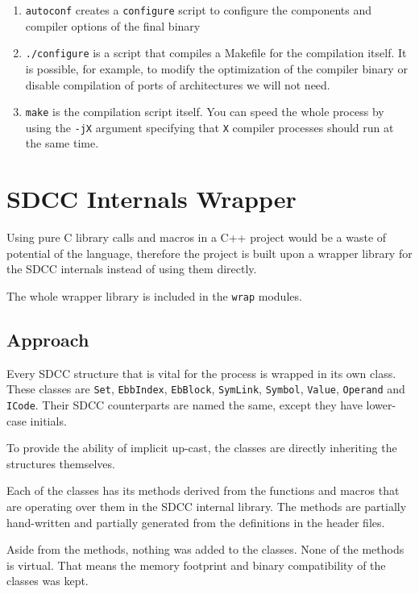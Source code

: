         \begin{enumerate}
        \item \texttt{autoconf} creates a \texttt{configure} script to configure the components and compiler options of the final binary
        \item \texttt{./configure} is a script that compiles a Makefile for the compilation itself. It is possible, for example, to modify the optimization of the compiler binary or disable compilation of ports of architectures we will not need.
        \item \texttt{make} is the compilation script itself. You can speed the whole process by using the \texttt{-jX} argument specifying that \texttt{X} compiler processes should run at the same time.
        \end{enumerate}

    \section{SDCC Internals Wrapper}

    Using pure C library calls and macros in a C++ project would be a waste of potential of the language, therefore the project is built upon a wrapper library for the SDCC internals instead of using them directly.

    The whole wrapper library is included in the \texttt{wrap} modules.

        \subsection{Approach}

            Every SDCC structure that is vital for the process is wrapped in its own class. These classes are \texttt{Set}, \texttt{EbbIndex}, \texttt{EbBlock}, \texttt{SymLink}, \texttt{Symbol}, \texttt{Value}, \texttt{Operand} and \texttt{ICode}. Their SDCC counterparts are named the same, except they have lower-case initials.

            To provide the ability of implicit up-cast, the classes are directly inheriting the structures themselves.

            Each of the classes has its methods derived from the functions and macros that are operating over them in the SDCC internal library. The methods are partially hand-written and partially generated from the definitions in the header files.

            Aside from the methods, nothing was added to the classes. None of the methods is virtual. That means the memory footprint and binary compatibility of the classes was kept.

